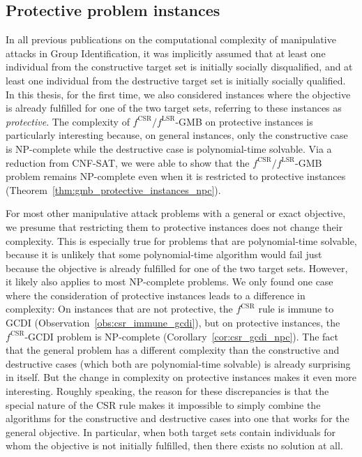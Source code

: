 \documentclass[
    12pt,               %
    a4paper,            %
    bibtotoc,           %
    pointlessnumbers,   %
    ngerman,            %
    titlepage,          %
    leqno,              %
    ]{scrarticle}       %
\newcommand\thmref{Theorem~\ref}
\newcommand\corref{Corollary~\ref}
\newcommand\obsref{Observation~\ref}
\begin{document}
\subsection{Protective problem instances}
\label{sec:conclusion_protective}

In all previous publications on the computational complexity of manipulative attacks in Group Identification, it was implicitly assumed that at least one individual from the constructive target set is initially socially disqualified, and at least one individual from the destructive target set is initially socially qualified. In this thesis, for the first time, we also considered instances where the objective is already fulfilled for one of the two target sets, referring to these instances as \emph{protective}. The complexity of $f^{\text{CSR}} / f^{\text{LSR}}$-GMB on protective instances is particularly interesting because, on general instances, only the constructive case is NP-complete while the destructive case is polynomial-time solvable. Via a reduction from CNF-SAT, we were able to show that the $f^{\text{CSR}} / f^{\text{LSR}}$-GMB problem remains NP-complete even when it is restricted to protective instances (\thmref{thm:gmb_protective_instances_npc}).

For most other manipulative attack problems with a general or exact objective, we presume that restricting them to protective instances does not change their complexity. This is especially true for problems that are polynomial-time solvable, because it is unlikely that some polynomial-time algorithm would fail just because the objective is already fulfilled for one of the two target sets. However, it likely also applies to most NP-complete problems. We only found one case where the consideration of protective instances leads to a difference in complexity: On instances that are not protective, the $f^{\text{CSR}}$ rule is immune to GCDI (\obsref{obs:csr_immune_gcdi}), but on protective instances, the $f^{\text{CSR}}$-GCDI problem is NP-complete (\corref{cor:csr_gcdi_npc}). The fact that the general problem has a different complexity than the constructive and destructive cases (which both are polynomial-time solvable) is already surprising in itself. But the change in complexity on protective instances makes it even more interesting. Roughly speaking, the reason for these discrepancies is that the special nature of the CSR rule makes it impossible to simply combine the algorithms for the constructive and destructive cases into one that works for the general objective. In particular, when both target sets contain individuals for whom the objective is not initially fulfilled, then there exists no solution at all.
\end{document}
